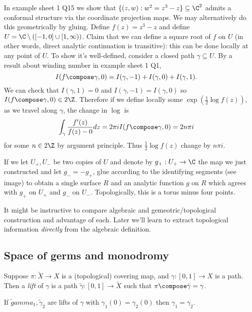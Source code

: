 \documentclass[a4paper]{article}
\begin{document}
\begin{eg}
  In example sheet 1 Q15 we show that \(\{(z, w): w^2 = z^3 - z\} \subseteq \C^2\) admits a conformal structure via the coordinate projection maps. We may alternatively do this geometrically by gluing. Define \(f(z) = z^3 - z\) and define \(U = \C \setminus ([-1, 0] \cup [1, \infty))\). Claim that we can define a square root of \(f\) on \(U\) (in other words, direct analytic continuation is transitive): this can be done locally at any point of \(U\). To show it's well-defined, consider a closed path \(\gamma \subseteq U\). By a result about winding number in example sheet 1 Q1,
  \[
    I(f \compose \gamma, 0) = I(\gamma, -1) + I(\gamma, 0) + I(\gamma, 1).
  \]
  We can check that \(I(\gamma, 1) = 0\) and \(I(\gamma, -1) = I(\gamma, 0)\) so \(I(f \compose \gamma, 0) \in 2 \Z\). Therefore if we define locally some \(\exp(\frac{1}{2} \log f(z))\), as we travel along \(\gamma\), the change in \(\log\) is
  \[
    \int_\gamma \frac{f'(z)}{f(z) - 0} dz = 2\pi i I(f \compose \gamma, 0) = 2n\pi i
  \]
  for some \(n \in 2\Z\) by argument principle. Thus \(\frac{1}{2} \log f(z)\) change by \(n\pi i\).

  If we let \(U_+, U_-\) be two copies of \(U\) and denote by \(g_+: U_+ \to \C\) the map we just constructed and let \(g_- = -g_+\), glue according to the identifying segments (see image) to obtain a single surface \(R\) and an analytic function \(g\) on \(R\) which agrees with \(g_+\) on \(U_+\) and \(g_-\) on \(U_-\). Topologically, this is a torus minus four points.

  It might be instructive to compare algebraic and gemeotric/topological construction and advantage of each. Later we'll learn to extract topological information \emph{directly} from the algebraic definition.
\end{eg}

\subsection{Space of germs and monodromy}

\begin{definition}[lift]
  Suppose \(\pi: \tilde X \to X\) is a (topological) covering map, and \(\gamma: [0, 1] \to X\) is a path. Then a \emph{lift} of \(\gamma\) is a path \(\tilde \gamma: [0, 1] \to \tilde X\) such that \(\pi \compose \tilde \gamma = \gamma\).
\end{definition}

\begin{proposition}
  If \(\tilde gamma_1, \tilde \gamma_2\) are lifts of \(\gamma\) with \(\gamma_1(0) = \gamma_2(0)\) then \(\gamma_1 = \gamma_2\).
\end{proposition}
\end{document}
